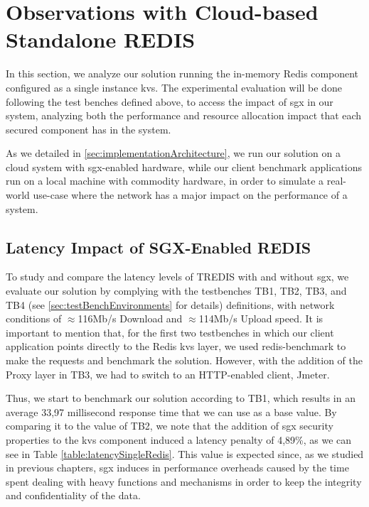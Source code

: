 \section{Observations with Cloud-based Standalone REDIS}
\label{sec:cloudS_Redis}

In this section, we analyze our solution running the in-memory Redis component configured as a single instance \gls{kvs}. The experimental evaluation will be done following the test benches defined above, to access the impact of \gls{sgx} in our system, analyzing both the performance and resource allocation impact that each secured component has in the system.

As we detailed in \ref{sec:implementationArchitecture}, we run our solution on a cloud system with \gls{sgx}-enabled hardware, while our client benchmark applications run on a local machine with commodity hardware, in order to simulate a real-world use-case where the network has a major impact on the performance of a system.

\subsection{Latency Impact of SGX-Enabled REDIS}

To study and compare the latency levels of TREDIS with and without \gls{sgx}, we evaluate our solution by complying with the testbenches TB1, TB2, TB3, and TB4 (see \ref{sec:testBenchEnvironments} for details) definitions, with network conditions of $\approx$116Mb/s Download and $\approx$114Mb/s Upload speed. It is important to mention that, for the first two testbenches in which our client application points directly to the Redis \gls{kvs} layer, we used redis-benchmark to make the requests and benchmark the solution. However, with the addition of the Proxy layer in TB3, we had to switch to an HTTP-enabled client, Jmeter.

Thus, we start to benchmark our solution according to TB1, which results in an average 33,97 millisecond response time that we can use as a base value.
By comparing it to the value of TB2, we note that the addition of \gls{sgx} security properties to the \gls{kvs} component induced a latency penalty of 4,89\%, as we can see in Table \ref{table:latencySingleRedis}. This value is expected since, as we studied in previous chapters, \gls{sgx} induces in performance overheads caused by the time spent dealing with heavy functions and mechanisms in order to keep the integrity and confidentiality of the data.

